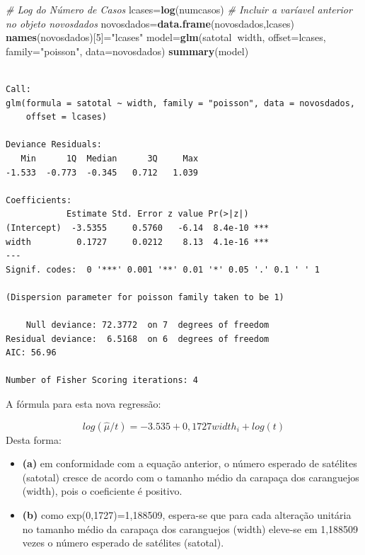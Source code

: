 \documentclass[12pt,brazil,oneside]{book}
\newenvironment{Shaded}{\begin{snugshade}}{\end{snugshade}}
\newcommand{\CommentTok}[1]{\textcolor[rgb]{0.56,0.35,0.01}{\textit{#1}}}
\newcommand{\DataTypeTok}[1]{\textcolor[rgb]{0.13,0.29,0.53}{#1}}
\newcommand{\DecValTok}[1]{\textcolor[rgb]{0.00,0.00,0.81}{#1}}
\newcommand{\KeywordTok}[1]{\textcolor[rgb]{0.13,0.29,0.53}{\textbf{#1}}}
\newcommand{\NormalTok}[1]{#1}
\newcommand{\OperatorTok}[1]{\textcolor[rgb]{0.81,0.36,0.00}{\textbf{#1}}}
\newcommand{\StringTok}[1]{\textcolor[rgb]{0.31,0.60,0.02}{#1}}
\providecommand{\tightlist}{%
  \setlength{\itemsep}{0pt}\setlength{\parskip}{0pt}}
\begin{document}
\begin{Shaded}
\begin{Highlighting}[]
\CommentTok{# Log do Número de Casos}
\NormalTok{lcases=}\KeywordTok{log}\NormalTok{(numcasos) }
\CommentTok{# Incluir a varíavel anterior no objeto novosdados}
\NormalTok{novosdados=}\KeywordTok{data.frame}\NormalTok{(novosdados,lcases) }
\KeywordTok{names}\NormalTok{(novosdados)[}\DecValTok{5}\NormalTok{]=}\StringTok{"lcases"}
\NormalTok{model=}\KeywordTok{glm}\NormalTok{(satotal}\OperatorTok{~}\NormalTok{width, }\DataTypeTok{offset=}\NormalTok{lcases, }\DataTypeTok{family=}\StringTok{"poisson"}\NormalTok{, }\DataTypeTok{data=}\NormalTok{novosdados)}
\KeywordTok{summary}\NormalTok{(model)}
\end{Highlighting}
\end{Shaded}

\begin{verbatim}

Call:
glm(formula = satotal ~ width, family = "poisson", data = novosdados, 
    offset = lcases)

Deviance Residuals: 
   Min      1Q  Median      3Q     Max  
-1.533  -0.773  -0.345   0.712   1.039  

Coefficients:
            Estimate Std. Error z value Pr(>|z|)    
(Intercept)  -3.5355     0.5760   -6.14  8.4e-10 ***
width         0.1727     0.0212    8.13  4.1e-16 ***
---
Signif. codes:  0 '***' 0.001 '**' 0.01 '*' 0.05 '.' 0.1 ' ' 1

(Dispersion parameter for poisson family taken to be 1)

    Null deviance: 72.3772  on 7  degrees of freedom
Residual deviance:  6.5168  on 6  degrees of freedom
AIC: 56.96

Number of Fisher Scoring iterations: 4
\end{verbatim}

A fórmula para esta nova regressão:

\[
log(\hat\mu/t)=-3.535 + 0,1727 width_i + log(t)
\]
Desta forma:

\begin{itemize}
\tightlist
\item
  \textbf{(a)} em conformidade com a equação anterior, o número esperado de satélites (satotal) cresce de acordo com o tamanho médio da carapaça dos caranguejos (width), pois o coeficiente é positivo.
\item
  \textbf{(b)} como exp(0,1727)=1,188509, espera-se que para cada alteração unitária no tamanho médio da carapaça dos caranguejos (width) eleve-se em 1,188509 vezes o número esperado de satélites (satotal).
\end{itemize}
\end{document}
